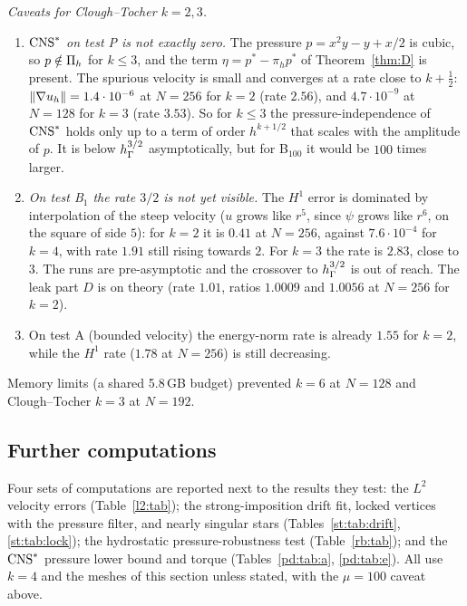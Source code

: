 \emph{Caveats for Clough--Tocher $k=2,3$.}
\begin{enumerate}
\item \emph{$\mathrm{CNS}^\ast$ on test P is not exactly zero.} The pressure $p=x^2y-y+x/2$ is cubic, so $p\notin\Pi_h$ for $k\le3$, and the term $\eta=p^\ast-\pi_hp^\ast$ of Theorem~\ref{thm:D} is present. The spurious velocity is small and converges at a rate close to $k+\frac12$: $\lVert \nabla u_h\rVert=1.4\cdot10^{-6}$ at $N=256$ for $k=2$ (rate $2.56$), and $4.7\cdot10^{-9}$ at $N=128$ for $k=3$ (rate $3.53$). So for $k\le3$ the pressure-independence of $\mathrm{CNS}^\ast$ holds only up to a term of order $h^{k+1/2}$ that scales with the amplitude of $p$. It is below $h_\Gamma^{3/2}$ asymptotically, but for B$_{100}$ it would be $100$ times larger.
\item \emph{On test B$_1$ the rate $3/2$ is not yet visible.} The $H^1$ error is dominated by interpolation of the steep velocity ($u$ grows like $r^5$, since $\psi$ grows like $r^6$, on the square of side $5$): for $k=2$ it is $0.41$ at $N=256$, against $7.6\cdot10^{-4}$ for $k=4$, with rate $1.91$ still rising towards $2$. For $k=3$ the rate is $2.83$, close to $3$. The runs are pre-asymptotic and the crossover to $h_\Gamma^{3/2}$ is out of reach. The leak part $D$ is on theory (rate $1.01$, ratios $1.0009$ and $1.0056$ at $N=256$ for $k=2$).
\item On test A (bounded velocity) the energy-norm rate is already $1.55$ for $k=2$, while the $H^1$ rate ($1.78$ at $N=256$) is still decreasing.
\end{enumerate}
Memory limits (a shared 5.8\,GB budget) prevented $k=6$ at $N=128$ and Clough--Tocher $k=3$ at $N=192$.

\subsection{Further computations}\label{num:further}
Four sets of computations are reported next to the results they test: the $L^2$ velocity errors (Table~\ref{l2:tab}); the strong-imposition drift fit, locked vertices with the pressure filter, and nearly singular stars (Tables~\ref{st:tab:drift}, \ref{st:tab:lock}); the hydrostatic pressure-robustness test (Table~\ref{rb:tab}); and the $\mathrm{CNS}^\ast$ pressure lower bound and torque (Tables~\ref{pd:tab:a}, \ref{pd:tab:e}). All use $k=4$ and the meshes of this section unless stated, with the $\mu=100$ caveat above.
